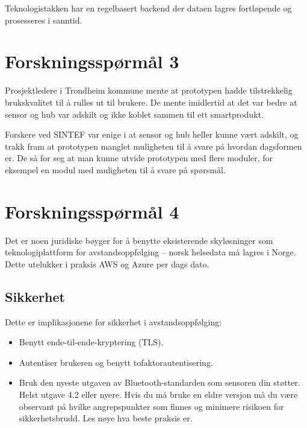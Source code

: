 Teknologistakken har en regelbasert backend der dataen lagres fortløpende og
prosesseres i sanntid.


\section{Forskningsspørmål 3}
\textbf{}

Prosjektledere i Trondheim kommune mente at prototypen hadde tilstrekkelig
brukskvalitet til å rulles ut til brukere. De mente imidlertid at det var bedre at
sensor og hub var adskilt og ikke koblet sammen til ett smartprodukt.

Forskere ved SINTEF var enige i at sensor og hub heller kunne vært adskilt, og trakk
fram at prototypen manglet muligheten til å svare på hvordan
dagsformen er. De så for seg at man kunne utvide prototypen med flere moduler,
for eksempel en modul med muligheten til å svare på spørsmål.

\section{Forskningsspørmål 4}
\textbf{}

Det er noen juridiske bøyger for å benytte eksisterende skyløsninger som teknologiplattform
for avstandsoppfølging -- norsk helsedata må lagres i Norge. Dette utelukker i
praksis AWS og Azure per dags dato.


\subsection{Sikkerhet} %
Dette er implikasjonene for sikkerhet i avstandsoppfølging:

\begin{itemize}
  \item Benytt ende-til-ende-kryptering (TLS).
  \item Autentiser brukeren og benytt tofaktorautentisering.
  \item Bruk den nyeste utgaven av Bluetooth-standarden som sensoren din
  støtter. Helst utgave 4.2 eller nyere. Hvis du må bruke en eldre versjon må
  du være observant på hvilke angrepspunkter som finnes og minimere risikoen for
  sikkerhetsbrudd. Les nøye hva beste praksis er.
\end{itemize}

